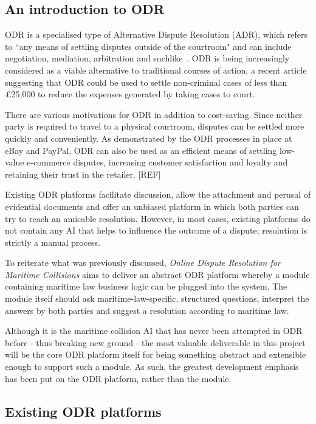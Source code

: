\subsection{An introduction to ODR}

ODR is a specialised type of Alternative Dispute Resolution (ADR), which refers to ``any means of settling disputes outside of the courtroom" and can include negotiation, mediation, arbitration and suchlike~\cite{define:ADR}. ODR is being increasingly considered as a viable alternative  to traditional courses of action, a recent article suggesting that ODR could be used to settle non-criminal cases of less than \pounds25,000 to reduce the expenses generated by taking cases to court.~\cite{article:odrPopular}

There are various motivations for ODR in addition to cost-saving. Since neither party is required to travel to a physical courtroom, disputes can be settled more quickly and conveniently. As demonstrated by the ODR processes in place at eBay and PayPal, ODR can also be used as an efficient means of settling low-value e-commerce disputes, increasing customer satisfaction and loyalty and retaining their trust in the retailer. [REF]

Existing ODR platforms facilitate discussion, allow the attachment and perusal of evidential documents and offer an unbiased platform in which both parties can try to reach an amicable resolution. However, in most cases, existing platforms do not contain any AI that helps to influence the outcome of a dispute; resolution is strictly a manual process.

To reiterate what was previously discussed, \emph{Online Dispute Resolution for Maritime Collisions} aims to deliver an abstract ODR platform whereby a module containing maritime law business logic can be plugged into the system. The module itself should ask maritime-law-specific, structured questions, interpret the answers by both parties and suggest a resolution according to maritime law.

Although it is the maritime collision AI that has never been attempted in ODR before - thus breaking new ground - the most valuable deliverable in this project will be the core ODR platform itself for being something abstract and extensible enough to support such a module. As such, the greatest development emphasis has been put on the ODR platform, rather than the module.

\subsection{Existing ODR platforms}

